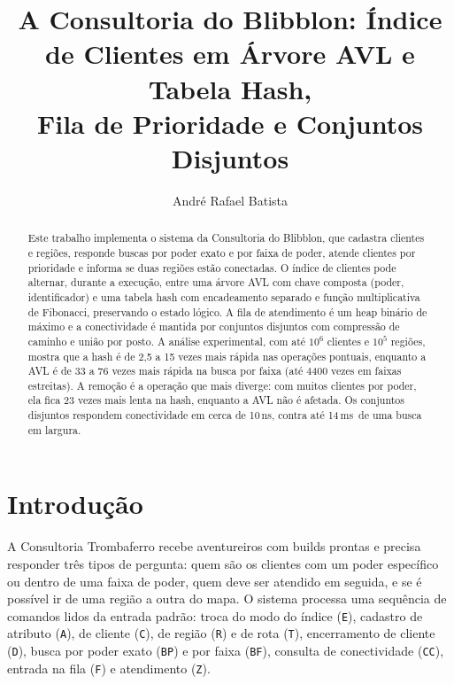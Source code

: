 \documentclass[letterpaper]{article} %
\title{A Consultoria do Blibblon: \'Indice de Clientes em \'Arvore AVL e Tabela Hash,\\
Fila de Prioridade e Conjuntos Disjuntos}
\author{
    Andr\'e Rafael Batista
}
\newcommand{\ns}{\,ns}
\newcommand{\ms}{\,ms}
\begin{document}
\maketitle

\begin{abstract}
Este trabalho implementa o sistema da Consultoria do Blibblon, que cadastra clientes e regi\~oes, responde buscas por poder exato e por faixa de poder, atende clientes por prioridade e informa se duas regi\~oes est\~ao conectadas. O \'indice de clientes pode alternar, durante a execu\c{c}\~ao, entre uma \'arvore AVL com chave composta (poder, identificador) e uma tabela hash com encadeamento separado e fun\c{c}\~ao multiplicativa de Fibonacci, preservando o estado l\'ogico. A fila de atendimento \'e um heap bin\'ario de m\'aximo e a conectividade \'e mantida por conjuntos disjuntos com compress\~ao de caminho e uni\~ao por posto. A an\'alise experimental, com at\'e $10^6$ clientes e $10^5$ regi\~oes, mostra que a hash \'e de 2,5 a 15 vezes mais r\'apida nas opera\c{c}\~oes pontuais, enquanto a AVL \'e de 33 a 76 vezes mais r\'apida na busca por faixa (at\'e 4400 vezes em faixas estreitas). A remo\c{c}\~ao \'e a opera\c{c}\~ao que mais diverge: com muitos clientes por poder, ela fica 23 vezes mais lenta na hash, enquanto a AVL n\~ao \'e afetada. Os conjuntos disjuntos respondem conectividade em cerca de 10\ns, contra at\'e 14\ms\ de uma busca em largura.
\end{abstract}

\section{Introdu\c{c}\~ao}

A Consultoria Trombaferro recebe aventureiros com builds prontas e precisa responder tr\^es tipos de pergunta: quem s\~ao os clientes com um poder espec\'ifico ou dentro de uma faixa de poder, quem deve ser atendido em seguida, e se \'e poss\'ivel ir de uma regi\~ao a outra do mapa. O sistema processa uma sequ\^encia de comandos lidos da entrada padr\~ao: troca do modo do \'indice (\texttt{E}), cadastro de atributo (\texttt{A}), de cliente (\texttt{C}), de regi\~ao (\texttt{R}) e de rota (\texttt{T}), encerramento de cliente (\texttt{D}), busca por poder exato (\texttt{BP}) e por faixa (\texttt{BF}), consulta de conectividade (\texttt{CC}), entrada na fila (\texttt{F}) e atendimento (\texttt{Z}).
\end{document}
